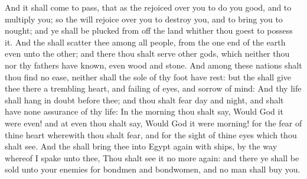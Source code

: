 \begin{biblechapter}
\verse And it shall come to pass, that as the \LORD rejoiced over you to do you good, and to multiply you; so the \LORD will rejoice over you to destroy you, and to bring you to nought; and ye shall be plucked from off the land whither thou goest to possess it.
\verse And the \LORD shall scatter thee among all people, from the one end of the earth even unto the other; and there thou shalt serve other gods, which neither thou nor thy fathers have known, even wood and stone.
\verse And among these nations shalt thou find no ease, neither shall the sole of thy foot have rest: but the \LORD shall give thee there a trembling heart, and failing of eyes, and sorrow of mind:
\verse And thy life shall hang in doubt before thee; and thou shalt fear day and night, and shalt have none assurance of thy life:
\verse In the morning thou shalt say, Would God it were even! and at even thou shalt say, Would God it were morning! for the fear of thine heart wherewith thou shalt fear, and for the sight of thine eyes which thou shalt see.
\verse And the \LORD shall bring thee into Egypt again with ships, by the way whereof I spake unto thee, Thou shalt see it no more again: and there ye shall be sold unto your enemies for bondmen and bondwomen, and no man shall buy you.
\end{biblechapter}

